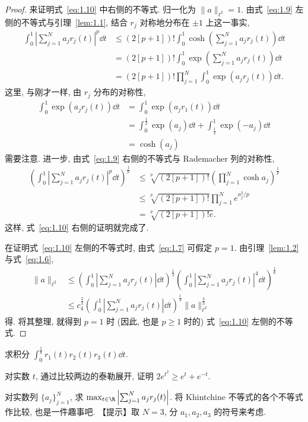 \begin{proof}
来证明式~\eqref{eq:1.10} 中右侧的不等式. 归一化为 $\|a\|_{\ell^{2}} = 1$. 由式~\eqref{eq:1.9} 左侧的不等式与引理~\ref{lem:1.1}, 结合 $r_{j}$ 对称地分布在 $\pm 1$ 上这一事实,
\begin{align*}
\int_{0}^{1} \left| \sum_{j=1}^{N} a_{j}r_{j}(t) \right|^{p} \dd t & \leq (2[p+1])! \int_{0}^{1} \cosh\left(\sum_{j=1}^{N} a_{j}r_{j}(t)\right) \dd t \\
& = (2[p+1])! \int_{0}^{1} \exp\left(\sum_{j=1}^{N} a_{j}r_{j}(t)\right) \dd t \\
& = (2[p+1])! \prod_{j=1}^{N} \int_{0}^{1} \exp(a_{j}r_{j}(t)) \dd t.
\end{align*}
这里, 与刚才一样, 由 $r_{j}$ 分布的对称性,
\begin{align*}
\int_{0}^{1} \exp(a_{j}r_{j}(t)) \dd t & = \int_{0}^{1} \exp(a_{j}r_{1}(t)) \dd t \\
& = \int_{0}^{\frac{1}{2}} \exp(a_{j}) \dd t + \int_{\frac{1}{2}}^{1} \exp(-a_{j}) \dd t \\
& = \cosh(a_{j})
\end{align*}
需要注意. 进一步, 由式~\eqref{eq:1.9} 右侧的不等式与 Rademacher 列的对称性,
\begin{align*}
\left(\int_{0}^{1} \left| \sum_{j=1}^{N} a_{j}r_{j}(t) \right|^{p} \dd t\right)^{\frac{1}{p}} & \leq \sqrt[p]{(2[p+1])!}\left(\prod_{j=1}^{N} \cosh a_{j}\right)^{\frac{1}{p}} \\
& \leq \sqrt[p]{(2[p+1])!}\prod_{j=1}^{N} e^{a_{j}^{2}/p} \\
& = \sqrt[p]{(2[p+1])! e}.
\end{align*}
这样, 式~\eqref{eq:1.10} 右侧的证明就完成了.

在证明式~\eqref{eq:1.10} 左侧的不等式时, 由式~\eqref{eq:1.7} 可假定 $p = 1$. 由引理~\ref{lem:1.2} 与式~\eqref{eq:1.6},
\begin{align*}
\| a \|_{\ell^{2}} & \leq \left(\int_{0}^{1} \left| \sum_{j=1}^{N} a_{j}r_{j}(t) \right| \dd t\right)^{\frac{1}{3}}\left(\int_{0}^{1} \left| \sum_{j=1}^{N} a_{j}r_{j}(t) \right|^{4} \dd t\right)^{\frac{1}{6}} \\
& \leq c_{4}^{\frac{2}{3}}\left(\int_{0}^{1} \left| \sum_{j=1}^{N} a_{j}r_{j}(t) \right| \dd t\right)^{\frac{1}{3}}\| a \|_{\ell^{2}}^{\frac{2}{3}}
\end{align*}
得. 将其整理, 就得到 $p = 1$ 时 (因此, 也是 $p \geq 1$ 时的) 式~\eqref{eq:1.10} 左侧的不等式.
\end{proof}

\begin{exercise}\label{exer:1.18}
求积分 $\int_{0}^{\frac{5}{8}} r_{1}(t)r_{2}(t)r_{3}(t) \dd t$.
\end{exercise}

\begin{exercise}\label{exer:1.19}
对实数 $t$, 通过比较两边的泰勒展开, 证明 $2e^{t^{2}} \geq e^{t} + e^{-t}$.
\end{exercise}

\begin{exercise}\label{exer:1.20}
对实数列 $\{a_{j}\}_{j=1}^{N}$, 求 $\max_{t \in \R}\left|\sum_{j=1}^{N} a_{j}r_{j}(t)\right|$. 将 Khintchine 不等式的各个不等式作比较, 也是一件趣事吧. 【提示】取 $N = 3$, 分 $a_{1}, a_{2}, a_{3}$ 的符号来考虑.
\end{exercise}
